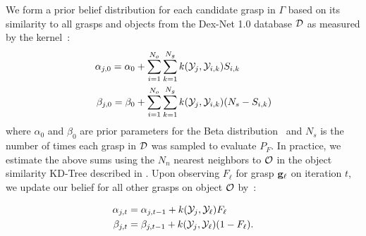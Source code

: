 We form a prior belief distribution for each candidate grasp in $\Gamma$ based on its similarity to all grasps and objects from the Dex-Net 1.0 database $\mathcal{D}$ as measured by the kernel~\cite{goetschalckx2011continuous}:
\begin{align}
	\alpha_{j,0} = \alpha_{0} & + \sum \limits_{i=1}^{N_o} \sum \limits_{k=1}^{N_g} k(\mathcal{Y}_{j}, \mathcal{Y}_{i, k}) S_{i,k} \label{eq:alpha-prior} \\
	\beta_{j,0} = \beta_{0} & + \sum \limits_{i=1}^{N_o} \sum \limits_{k=1}^{N_g}  k(\mathcal{Y}_{j}, \mathcal{Y}_{i,k}) (N_s - S_{i,k}) \label{eq:beta-prior}
\end{align}
\noindent where $\alpha_{0}$ and $\beta_{0}$ are prior parameters for the Beta distribution~\cite{laskey2015bandits} and $N_s$ is the number of times each grasp in $\mathcal{D}$ was sampled to evaluate $P_F$.
In practice, we estimate the above sums using the $N_n$ nearest neighbors to $\mathcal{O}$ in the object similarity KD-Tree described in .
Upon observing $F_{\ell}$ for grasp $\mathbf{g}_{\ell}$ on iteration $t$, we update our belief for all other grasps on object $\mathcal{O}$ by~\cite{goetschalckx2011continuous}:

\vspace{-2ex}
\begin{align}
	\alpha_{j,t} &= \alpha_{j,t-1} + k(\mathcal{Y}_{j}, \mathcal{Y}_{\ell}) F_{\ell} \label{eq:alpha} \\
	\beta_{j,t} &= \beta_{j,t-1} + k(\mathcal{Y}_{j}, \mathcal{Y}_{\ell}) (1 - F_{\ell})\label{eq:beta}.
\end{align}

